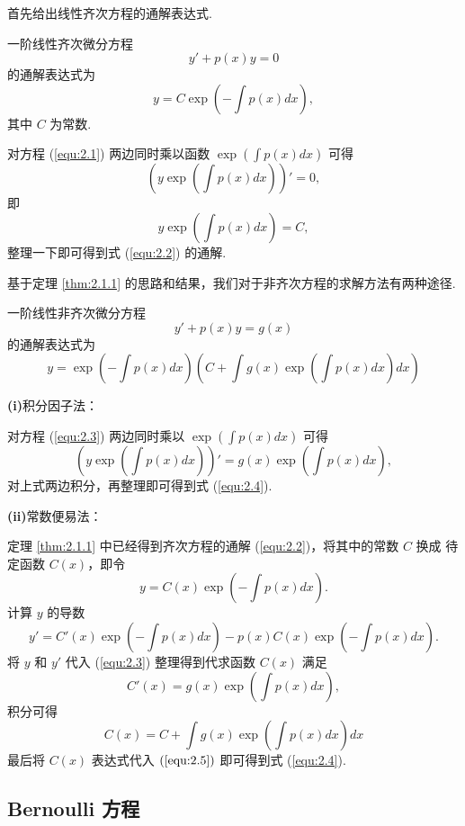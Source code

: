 首先给出线性齐次方程的通解表达式.
\begin{thm}\label{thm:2.1.1}
一阶线性齐次微分方程
\begin{equation}\label{equ:2.1}
y'+p(x)y=0
\end{equation}
的通解表达式为
\begin{equation}\label{equ:2.2}
y=C\exp\left(-\int p(x)dx\right),
\end{equation}
其中 $C$ 为常数.
\begin{pf1}
对方程 (\ref{equ:2.1}) 两边同时乘以函数 $\exp\left(\int p(x)dx\right)$ 可得
\[
\left(y\exp\left(\int p(x)dx\right)\right)'=0,
\]
即
\[
y\exp\left(\int p(x)dx\right)=C,
\]
整理一下即可得到式 (\ref{equ:2.2}) 的通解.
\end{pf1}

基于定理 \ref{thm:2.1.1} 的思路和结果，我们对于非齐次方程的求解方法有两种途径.
\begin{thm}
一阶线性非齐次微分方程
\begin{equation}\label{equ:2.3}
y'+p(x)y=g(x)
\end{equation}
的通解表达式为
\begin{equation}\label{equ:2.4}
y=\exp\left(-\int p(x)dx\right)\left(C+\int g(x)\exp\left(\int p(x)dx\right)dx\right)
\end{equation}
\end{thm}
\begin{pf1}
\textbf{(i)}积分因子法：

对方程 (\ref{equ:2.3}) 两边同时乘以 $\exp\left(\int p(x)dx\right)$ 可得
\[
\left(y\exp\left(\int p(x)dx\right)\right)'=g(x)\exp\left(\int p(x)dx\right),
\]
对上式两边积分，再整理即可得到式 (\ref{equ:2.4}).

\textbf{(ii)}常数便易法：

定理 \ref{thm:2.1.1} 中已经得到齐次方程的通解 (\ref{equ:2.2})，将其中的常数 $C$ 换成
待定函数 $C(x)$，即令
\begin{equation}\label{equ:2.5}
y=C(x)\exp\left(-\int p(x)dx\right).
\end{equation}
计算 $y$ 的导数
\[
y'=C'(x)\exp\left(-\int p(x)dx\right)-p(x)C(x)\exp\left(-\int p(x)dx\right).
\]
将 $y$ 和 $y'$ 代入 (\ref{equ:2.3}) 整理得到代求函数 $C(x)$ 满足
\[
C'(x)=g(x)\exp\left(\int p(x)dx\right),
\]
积分可得
\[
C(x)=C+\int g(x)\exp\left(\int p(x)dx\right)dx
\]
最后将 $C(x)$ 表达式代入 $(\ref{equ:2.5})$ 即可得到式 (\ref{equ:2.4}).
\end{pf1}
\end{thm}

\subsection{Bernoulli 方程}

